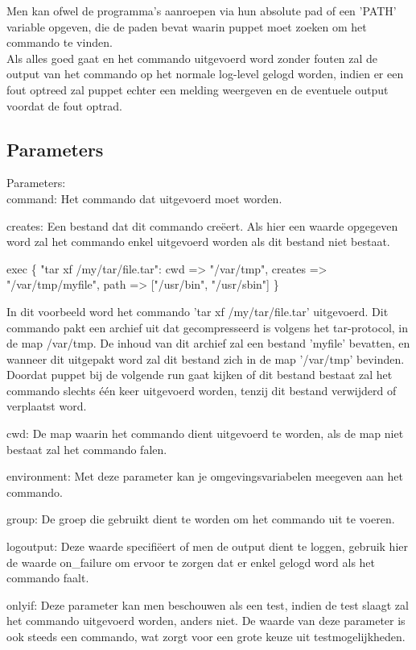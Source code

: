 	Men kan ofwel de programma's aanroepen via hun absolute pad of een 'PATH' variable opgeven, die de paden bevat waarin puppet moet zoeken om het commando te vinden.\\
	Als alles goed gaat en het commando uitgevoerd word zonder fouten zal de output van het commando op het normale log-level gelogd worden, indien er een fout optreed zal puppet echter een melding weergeven en de eventuele output voordat de fout optrad.\\


\subsection{Parameters}
Parameters:\\
		command:
		Het commando dat uitgevoerd moet worden.

		creates:
		Een bestand dat dit commando creëert.
		Als hier een waarde opgegeven word zal het commando enkel uitgevoerd worden als dit bestand niet bestaat.

			exec \{ "tar xf /my/tar/file.tar":
				cwd => "/var/tmp",
				creates => "/var/tmp/myfile",
				path => ["/usr/bin", "/usr/sbin"]
			\}

		In dit voorbeeld word het commando 'tar xf /my/tar/file.tar' uitgevoerd.
		Dit commando pakt een archief uit dat gecompresseerd is volgens het tar-protocol, in de map /var/tmp.
		De inhoud van dit archief zal een bestand 'myfile' bevatten, en wanneer dit uitgepakt word zal dit bestand zich in de map '/var/tmp' bevinden.
		Doordat puppet bij de volgende run gaat kijken of dit bestand bestaat zal het commando slechts één keer uitgevoerd worden, tenzij dit bestand verwijderd of verplaatst word.

		cwd:
		De map waarin het commando dient uitgevoerd te worden, als de map niet bestaat zal het commando falen.

		environment:
		Met deze parameter kan je omgevingsvariabelen meegeven aan het commando.

		group:
		De groep die gebruikt dient te worden om het commando uit te voeren.

		logoutput:
		Deze waarde specifiëert of men de output dient te loggen, gebruik hier de waarde on\_failure om ervoor te zorgen dat er enkel gelogd word als het commando faalt.

		onlyif:
		Deze parameter kan men beschouwen als een test, indien de test slaagt zal het commando uitgevoerd worden, anders niet.
		De waarde van deze parameter is ook steeds een commando, wat zorgt voor een grote keuze uit testmogelijkheden.

